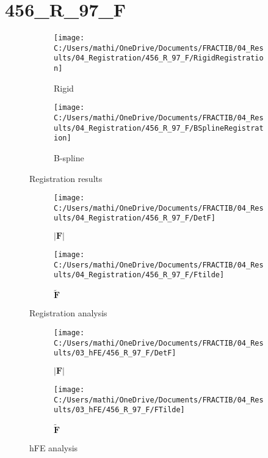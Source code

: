 \documentclass{article}%
\begin{document}
%
\newpage%
\section*{456\_R\_97\_F}%
\label{sec:456R97F}%


\begin{figure}[h!]%
\begin{subfigure}[b]{0.5\linewidth}%
\texttt{[image: C:/Users/mathi/OneDrive/Documents/FRACTIB/04\_Results/04\_Registration/456\_R\_97\_F/RigidRegistration]}%
\caption{Rigid}%
\end{subfigure}%
\begin{subfigure}[b]{0.5\linewidth}%
\texttt{[image: C:/Users/mathi/OneDrive/Documents/FRACTIB/04\_Results/04\_Registration/456\_R\_97\_F/BSplineRegistration]}%
\caption{B{-}spline}%
\end{subfigure}%
\caption{Registration results}%
\end{figure}

%


\begin{figure}[h!]%
\begin{subfigure}[b]{0.5\linewidth}%
\texttt{[image: C:/Users/mathi/OneDrive/Documents/FRACTIB/04\_Results/04\_Registration/456\_R\_97\_F/DetF]}%
\caption{$|\mathbf{F}|$}%
\end{subfigure}%
\begin{subfigure}[b]{0.5\linewidth}%
\texttt{[image: C:/Users/mathi/OneDrive/Documents/FRACTIB/04\_Results/04\_Registration/456\_R\_97\_F/Ftilde]}%
\caption{$\tilde{\mathbf{F}}$}%
\end{subfigure}%
\caption{Registration analysis}%
\end{figure}

%


\begin{figure}[h!]%
\begin{subfigure}[b]{0.5\linewidth}%
\texttt{[image: C:/Users/mathi/OneDrive/Documents/FRACTIB/04\_Results/03\_hFE/456\_R\_97\_F/DetF]}%
\caption{$|\mathbf{F}|$}%
\end{subfigure}%
\begin{subfigure}[b]{0.5\linewidth}%
\texttt{[image: C:/Users/mathi/OneDrive/Documents/FRACTIB/04\_Results/03\_hFE/456\_R\_97\_F/FTilde]}%
\caption{$\tilde{\mathbf{F}}$}%
\end{subfigure}%
\caption{hFE analysis}%
\end{figure}

%
\newpage%
\end{document}
